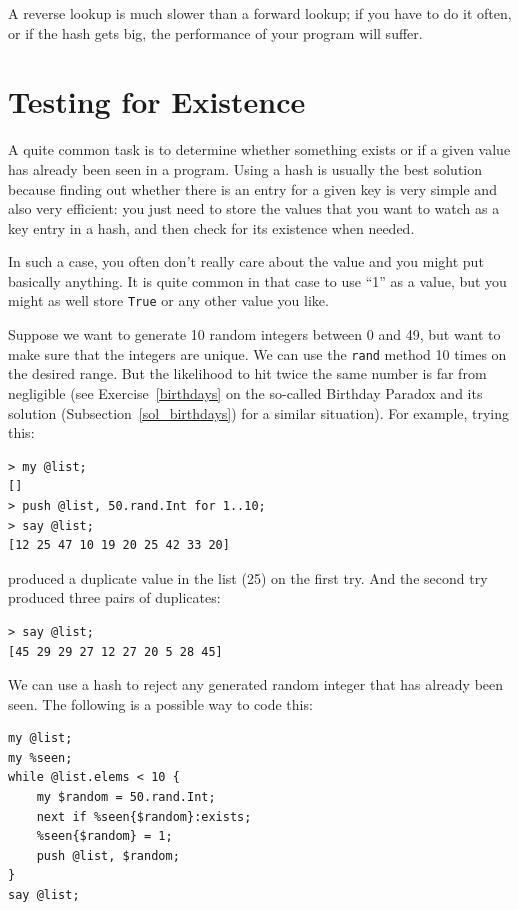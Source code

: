 A reverse lookup is much slower than a forward lookup; if you
have to do it often, or if the hash gets big, the performance
of your program will suffer.

\section{Testing for Existence}

A quite common task is to determine whether something exists or 
if a given value has already been seen in a program. Using a 
hash is usually the best solution because finding out whether 
there is an entry for a given key is very simple and also 
very efficient: you just need to store the values that you 
want to watch as a key entry in a hash, and then check for 
its existence when needed.

In such a case, you often don't really 
care about the value and you might put basically anything. 
It is quite common in that case to use ``1'' as a value, but 
you might as well store {\tt True} or any other value you 
like.

Suppose we want to generate 10 random integers between 0 and 
49, but want to make sure that the integers are unique. We 
can use the {\tt rand} method 10 times on the desired range. But 
the likelihood to hit twice the same number is far from 
negligible (see Exercise~\ref{birthdays} on the so-called 
Birthday Paradox and its solution (Subsection~\ref{sol_birthdays}) 
for a similar situation). For example, trying this:

\begin{verbatim}
> my @list;
[]
> push @list, 50.rand.Int for 1..10;
> say @list;
[12 25 47 10 19 20 25 42 33 20]
\end{verbatim}

produced a duplicate value in the list (25) on the first try.
And the second try produced three pairs of duplicates:

\begin{verbatim}
> say @list;
[45 29 29 27 12 27 20 5 28 45]
\end{verbatim}

We can use a hash to reject any generated random integer 
that has already been seen. The following is a possible way to 
code this:

\begin{verbatim}
my @list;
my %seen;
while @list.elems < 10 {
    my $random = 50.rand.Int;
    next if %seen{$random}:exists;
    %seen{$random} = 1;
    push @list, $random;
}
say @list;
\end{verbatim}

